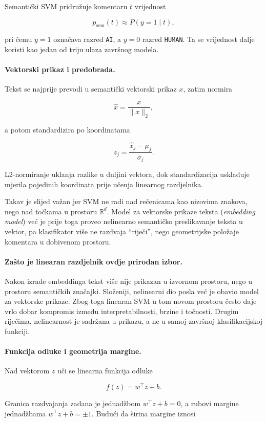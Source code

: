 \documentclass{article}
\begin{document}
Semantički SVM pridružuje komentaru $t$ vrijednost

\[
p_{\mathrm{sem}}(t) \approx P(y=1\mid t),
\]

pri čemu $y=1$ označava razred \texttt{AI}, a $y=0$ razred \texttt{HUMAN}. Ta se vrijednost dalje koristi kao jedan od triju ulaza završnog modela.

\paragraph{Vektorski prikaz i predobrada.}
Tekst se najprije prevodi u semantički vektorski prikaz $x$, zatim normira

\[
\hat{x}=\frac{x}{\|x\|_2},
\]

a potom standardizira po koordinatama

\[
z_j=\frac{\hat{x}_j-\mu_j}{\sigma_j}.
\]

L2-normiranje uklanja razlike u duljini vektora, dok standardizacija usklađuje mjerila pojedinih koordinata prije učenja linearnog razdjelnika.

Takav je slijed važan jer SVM ne radi nad rečenicama kao nizovima znakova, nego nad točkama u prostoru $\mathbb{R}^d$. Model za vektorske prikaze teksta (\textit{embedding model}) već je prije toga proveo nelinearno semantičko preslikavanje teksta u vektor, pa klasifikator više ne razdvaja ``riječi'', nego geometrijske položaje komentara u dobivenom prostoru.

\paragraph{Zašto je linearan razdjelnik ovdje prirodan izbor.}
Nakon izrade embeddinga tekst više nije prikazan u izvornom prostoru, nego u prostoru semantičkih značajki. Složeniji, nelinearni dio posla već je obavio model za vektorske prikaze. Zbog toga linearan SVM u tom novom prostoru često daje vrlo dobar kompromis između interpretabilnosti, brzine i točnosti. Drugim riječima, nelinearnost je sadržana u prikazu, a ne u samoj završnoj klasifikacijskoj funkciji.

\paragraph{Funkcija odluke i geometrija margine.}
Nad vektorom $z$ uči se linearna funkcija odluke

\[
f(z)=w^\top z+b.
\]

Granica razdvajanja zadana je jednadžbom $w^\top z+b=0$, a rubovi margine jednadžbama $w^\top z+b=\pm 1$. Budući da širina margine iznosi
\end{document}
